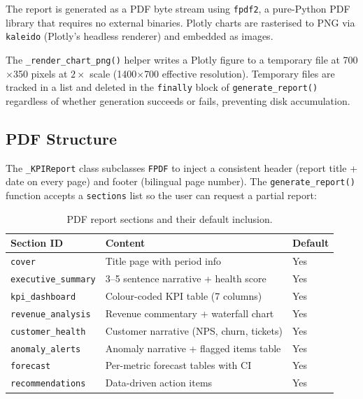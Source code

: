The report is generated as a PDF byte stream using \texttt{fpdf2}, a pure-Python PDF library that requires no external binaries. Plotly charts are rasterised to PNG via \texttt{kaleido} (Plotly's headless renderer) and embedded as images.

The \texttt{\_render\_chart\_png()} helper writes a Plotly figure to a temporary file at 700$\times$350 pixels at $2\times$ scale (1400$\times$700 effective resolution). Temporary files are tracked in a list and deleted in the \texttt{finally} block of \texttt{generate\_report()} regardless of whether generation succeeds or fails, preventing disk accumulation.

\subsection{PDF Structure}

The \texttt{\_KPIReport} class subclasses \texttt{FPDF} to inject a consistent header (report title + date on every page) and footer (bilingual page number). The \texttt{generate\_report()} function accepts a \texttt{sections} list so the user can request a partial report:

\begin{table}[h]
\centering
\caption{PDF report sections and their default inclusion.}
\begin{tabular}{lll}
\toprule
\textbf{Section ID} & \textbf{Content} & \textbf{Default} \\
\midrule
\texttt{cover}              & Title page with period info               & Yes \\
\texttt{executive\_summary} & 3--5 sentence narrative + health score    & Yes \\
\texttt{kpi\_dashboard}     & Colour-coded KPI table (7 columns)        & Yes \\
\texttt{revenue\_analysis}  & Revenue commentary + waterfall chart      & Yes \\
\texttt{customer\_health}   & Customer narrative (NPS, churn, tickets)  & Yes \\
\texttt{anomaly\_alerts}    & Anomaly narrative + flagged items table   & Yes \\
\texttt{forecast}           & Per-metric forecast tables with CI        & Yes \\
\texttt{recommendations}    & Data-driven action items                  & Yes \\
\bottomrule
\end{tabular}
\label{tab:pdf-sections}
\end{table}

